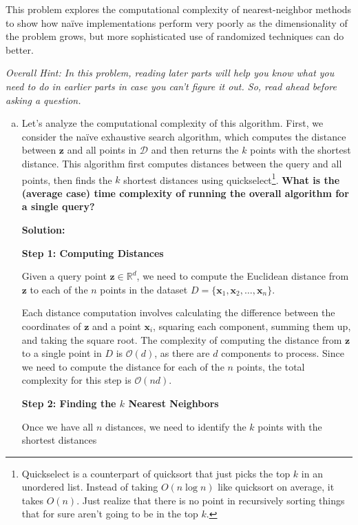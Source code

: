 \documentclass{article}
\renewcommand{\vec}[1]{\boldsymbol{\mathbf{#1}}}
\newenvironment{solution}{\color{blue} \smallskip \textbf{Solution:}}{}
\begin{document}
This problem explores the computational complexity of nearest-neighbor methods to show how na\"{i}ve implementations perform very poorly as the dimensionality of the problem grows, but more sophisticated use of randomized techniques can do better. 

{\em Overall Hint: In this problem, reading later parts will help you know what you need to do in earlier parts in case you can't figure it out. So, read ahead before asking a question.}

\begin{enumerate}[(a)]
    \item 
    Let's analyze the computational complexity of this algorithm. 
    First, we consider the na\"{i}ve exhaustive search algorithm, which computes the distance between $\vec{z}$ and all points in $\mathcal{D}$ and then returns the $k$ points with the shortest distance. 
    This algorithm first computes distances between the query and all points, then finds the $k$ shortest distances using quickselect\footnote{Quickselect is a counterpart of quicksort that just picks the top $k$ in an unordered list. Instead of taking $O(n \log n)$ like quicksort on average, it takes $O(n)$. Just realize that there is no point in recursively sorting things that for sure aren't going to be in the top $k$.}.
    {\bf What is the (average case) time complexity of running the overall algorithm for a single query?} 
    
    \begin{solution}


\textbf{Step 1: Computing Distances}

Given a query point \(\mathbf{z} \in \mathbb{R}^d\), we need to compute the Euclidean distance from \(\mathbf{z}\) to each of the \(n\) points in the dataset \(D = \{\mathbf{x}_1, \mathbf{x}_2, \dots, \mathbf{x}_n\}\).

Each distance computation involves calculating the difference between the coordinates of \(\mathbf{z}\) and a point \(\mathbf{x}_i\), squaring each component, summing them up, and taking the square root. The complexity of computing the distance from \(\mathbf{z}\) to a single point in \(D\) is \(\mathcal{O}(d)\), as there are \(d\) components to process.
Since we need to compute the distance for each of the \(n\) points, the total complexity for this step is \(\mathcal{O}(nd)\).

\textbf{Step 2: Finding the \(k\) Nearest Neighbors}

Once we have all \(n\) distances, we need to identify the \(k\) points with the shortest distances


\end{solution}
\end{enumerate}
\end{document}
